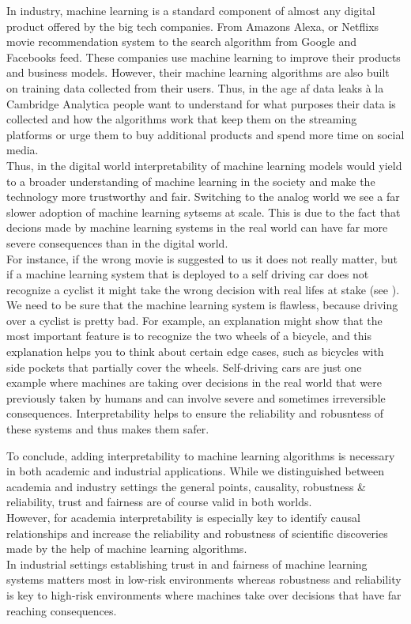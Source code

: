 \documentclass[
]{krantz}
\begin{document}
In industry, machine learning is a standard component of almost any digital product offered by the big tech companies. From Amazons Alexa, or Netflixs movie recommendation system to the search algorithm from Google and Facebooks feed. These companies use machine learning to improve their products and business models. However, their machine learning algorithms are also built on training data collected from their users.
Thus, in the age af data leaks à la Cambridge Analytica people want to understand for what purposes their data is collected and how the algorithms work that keep them on the streaming platforms or urge them to buy additional products and spend more time on social media.\\
Thus, in the digital world interpretability of machine learning models would yield to a broader understanding of machine learning in the society and make the technology more trustworthy and fair.
Switching to the analog world we see a far slower adoption of machine learning sytsems at scale. This is due to the fact that decions made by machine learning systems in the real world can have far more severe consequences than in the digital world.\\
For instance, if the wrong movie is suggested to us it does not really matter, but if a machine learning system that is deployed to a self driving car does not recognize a cyclist it might take the wrong decision with real lifes at stake (see \citet{molnar2019}). We need to be sure that the machine learning system is flawless, because driving over a cyclist is pretty bad. For example, an explanation might show that the most important feature is to recognize the two wheels of a bicycle, and this explanation helps you to think about certain edge cases, such as bicycles with side pockets that partially cover the wheels. Self-driving cars are just one example where machines are taking over decisions in the real world that were previously taken by humans and can involve severe and sometimes irreversible consequences. Interpretability helps to ensure the reliability and robusntess of these systems and thus makes them safer.

To conclude, adding interpretability to machine learning algorithms is necessary in both academic and industrial applications. While we distinguished between academia and industry settings the general points, causality, robustness \& reliability, trust and fairness are of course valid in both worlds.\\
However, for academia interpretability is especially key to identify causal relationships and increase the reliability and robustness of scientific discoveries made by the help of machine learning algorithms.\\
In industrial settings establishing trust in and fairness of machine learning systems matters most in low-risk environments whereas robustness and reliability is key to high-risk environments where machines take over decisions that have far reaching consequences.
\end{document}
